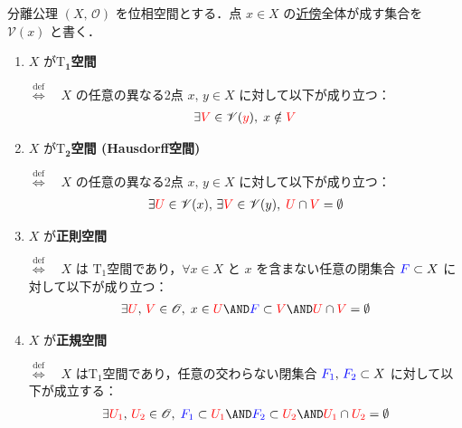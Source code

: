 \documentclass[geometry_main]{subfiles}
\begin{document}
\begin{mydef}[label=def:separation, breakable]{分離公理}
	$(X,\, \mathscr{O})$ を位相空間とする．点 $x \in X$ の\hyperref[def:neighborhood]{近傍}全体が成す集合を $\mathscr{V}(x)$ と書く．
	\begin{enumerate}
		\item $X$ が\textbf{$\bm{\mathrm{T}_1}$空間}
		
		$\stackrel{\mathrm{def}}{\Longleftrightarrow}$　$X$ の任意の異なる2点 $x,\, y \in X$ に対して以下が成り立つ：
		\begin{align}
			\exists \textcolor{red}{V} \in \mathscr{V}(\textcolor{red}{y}),\; x \notin \textcolor{red}{V}
		\end{align}
		\item $X$ が\textbf{$\bm{\mathrm{T}_2}$空間 (Hausdorff空間)}
		
		$\stackrel{\mathrm{def}}{\Longleftrightarrow}$　$X$ の任意の異なる2点 $x,\, y \in X$ に対して以下が成り立つ：
		\begin{align}
			\exists \textcolor{red}{U} \in \mathscr{V}(x),\, \exists \textcolor{red}{V} \in \mathscr{V}(y),\; \textcolor{red}{U} \cap \textcolor{red}{V} = \emptyset
		\end{align}
		\item $X$ が\textbf{正則空間}
		
		$\stackrel{\mathrm{def}}{\Longleftrightarrow}$　$X$ は $\mathrm{T}_1$空間であり，$\forall x \in X$ と $x$ を含まない任意の閉集合 $\textcolor{blue}{F} \subset X$ に対して以下が成り立つ：
		\begin{align}
			\exists \textcolor{red}{U},\, \textcolor{red}{V} \in \mathscr{O},\; x \in \textcolor{red}{U} \AND  \textcolor{blue}{F} \subset \textcolor{red}{V} \AND \textcolor{red}{U} \cap \textcolor{red}{V} = \emptyset
		\end{align}
		\item $X$ が\textbf{正規空間}
		
		$\stackrel{\mathrm{def}}{\Longleftrightarrow}$　$X$ は$\mathrm{T}_1$空間であり，任意の交わらない閉集合 $\textcolor{blue}{F_1},\, \textcolor{blue}{F_2} \subset X$ に対して以下が成立する：
		\begin{align}
			\exists \textcolor{red}{U_1},\, \textcolor{red}{U_2} \in \mathscr{O},\; \textcolor{blue}{F_1} \subset \textcolor{red}{U_1} \AND \textcolor{blue}{F_2} \subset \textcolor{red}{U_2} \AND \textcolor{red}{U_1} \cap \textcolor{red}{U_2} = \emptyset
		\end{align}
	\end{enumerate}
\end{mydef}
\end{document}
